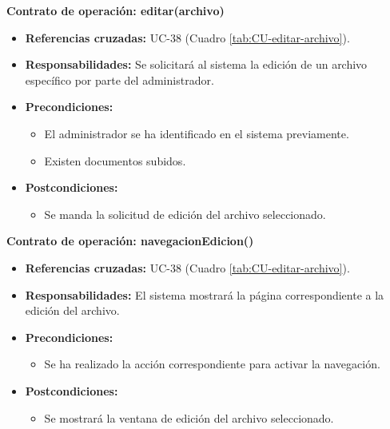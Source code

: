 \textbf{Contrato de operación: editar(archivo)}
\begin{itemize}
\item \textbf{Referencias cruzadas:} UC-38 (Cuadro \ref{tab:CU-editar-archivo}).
\item \textbf{Responsabilidades:} Se solicitará al sistema la edición de un archivo específico por parte del administrador.
\item \textbf{Precondiciones:} 
 \begin{itemize}
\item El administrador se ha identificado en el sistema previamente.
\item Existen documentos subidos.
\end {itemize}
\item \textbf{Postcondiciones:} 
 \begin{itemize}
\item Se manda la solicitud de edición del archivo seleccionado.
\end {itemize}
\end {itemize}

\textbf{Contrato de operación: navegacionEdicion()}
\begin{itemize}
\item \textbf{Referencias cruzadas:} UC-38 (Cuadro \ref{tab:CU-editar-archivo}).
\item \textbf{Responsabilidades:} El sistema mostrará la página correspondiente a la edición del archivo.
\item \textbf{Precondiciones:} 
 \begin{itemize}
\item Se ha realizado la acción correspondiente para activar la navegación.
\end {itemize}
\item \textbf{Postcondiciones:} 
 \begin{itemize}
\item Se mostrará la ventana de edición del archivo seleccionado.
\end {itemize}
\end {itemize}

